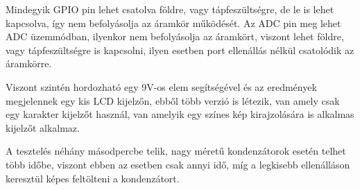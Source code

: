 Mindegyik GPIO pin lehet csatolva földre, vagy tápfeszültségre, de le is lehet kapcsolva, így 
nem befolyásolja az áramkör működését. Az ADC pin meg lehet ADC üzemmódban, ilyenkor nem befolyásolja
az áramkört, viszont lehet földre, vagy tápfeszültségre is kapcsolni, ilyen esetben port ellenállás
nélkül csatolódik az áramkörre.

Viszont szintén hordozható egy 9V-os elem segítségével és az eredmények megjelennek egy
kis LCD kijelzőn, ebből több verzió is létezik, van amely csak egy karakter kijelzőt
használ, van amelyik egy színes kép kirajzolására is alkalmas kijelzőt alkalmaz. 

A tesztelés néhány másodpercbe telik, nagy méretű kondenzátorok esetén telhet több időbe,
viszont ebben az esetben csak annyi idő, míg a legkisebb ellenálláson keresztül képes feltölteni
a kondenzátort.